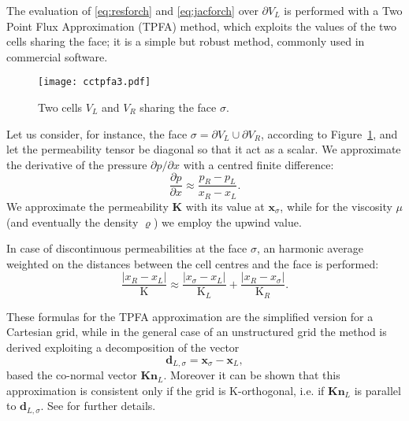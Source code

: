 The evaluation of \eqref{eq:resforch} and \eqref{eq:jacforch} over $\partial 
V_L$ is performed with a Two Point Flux Approximation (TPFA) method, which 
exploits the values of the two cells sharing the face; it is a 
simple but robust method, commonly used in commercial software.
\begin{figure}
	\centering
	\texttt{[image: cctpfa3.pdf]}
	\caption[Two cells $V_L$ and $V_R$ sharing the face $\sigma$]{Two cells 
	$V_L$ and $V_R$ sharing the face $\sigma$.}
	\label{fig:cctpfa}
\end{figure}
Let us consider, for instance, the face $\sigma = \partial V_L \cup \partial 
V_R$, according to Figure~\ref{fig:cctpfa}, and let the permeability tensor be 
diagonal so that it act as a scalar. We approximate the derivative of the 
pressure $\partial p /\partial 
x$ with a centred finite difference:
\begin{equation}
\frac{\partial p}{\partial x} \approx \frac{p_R-p_L}{x_R -x_L}.
\end{equation}
We approximate the permeability $\mathbf{K}$ with its value at 
$\mathbf{x}_\sigma$, while 
for the viscosity $\mu$ (and eventually the density $\varrho$) we employ the 
upwind value.

In case of discontinuous permeabilities at the face $\sigma$, an harmonic 
average weighted on the distances between the cell centres and the face is 
performed:
\begin{equation}
\frac{|x_R - x_L|}{\mathrm{K}} \approx 
\frac{|x_\sigma - x_L|}{\mathrm{K}_L}+\frac{|x_R - x_\sigma|}{\mathrm{K}_R}.
\end{equation}

These formulas for the TPFA approximation are the simplified version for a 
Cartesian grid, while in the general case of an unstructured grid the method is 
derived exploiting a decomposition of the vector
\begin{equation}
\mathbf{d}_{L,\sigma}=\mathbf{x}_\sigma - \mathbf{x}_L,
\end{equation}
based the co-normal vector $\mathbf{Kn}_L$. Moreover it 
can be shown that this approximation is consistent only if the grid is 
K-orthogonal, i.e. if $\mathbf{Kn}_L$ is parallel to $\mathbf{d}_{L, \sigma}$. 
See \cite{tesi:wolff} for further details.
%
